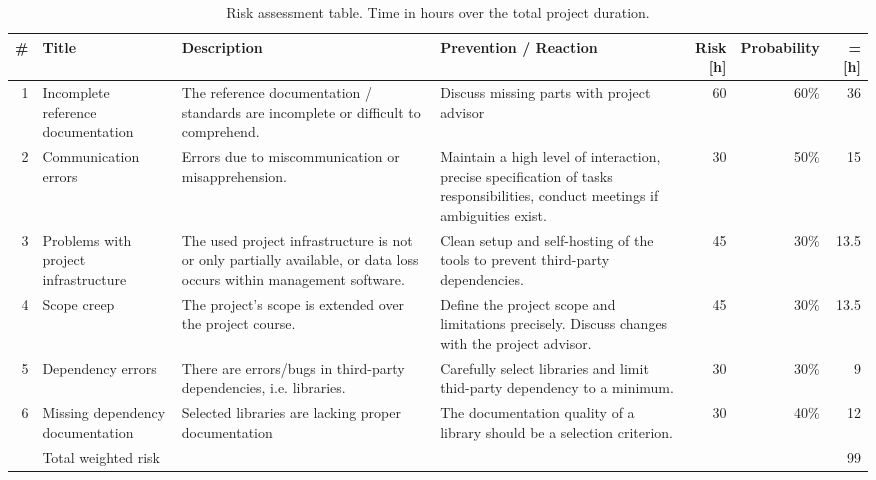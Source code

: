 \begin{table}
    \centering
    \caption[Risk assessment]{Risk assessment table. Time in hours over the total project duration.}
    \label{tbl:project-risks}
    \begin{tabu}{r l X X r r r}
        \hline
        \# & Title & Description & Prevention / Reaction & Risk [h] & Probability & = [h] \\ \hline

        1 & Incomplete reference documentation
          & The reference documentation / standards are incomplete or difficult to comprehend.
          & Discuss missing parts with project advisor
          & 60 & 60\% & 36\\

        2 & Communication errors
          & Errors due to miscommunication or misapprehension.
          & Maintain a high level of interaction, precise specification of tasks responsibilities, conduct meetings if ambiguities exist.
          & 30 & 50\% & 15\\

        3 & Problems with project infrastructure
          & The used project infrastructure is not or only partially available, or data loss occurs within management software.
          & Clean setup and self-hosting of the tools to prevent third-party dependencies.
          & 45 & 30\% & 13.5 \\

        4 & Scope creep
          & The project's scope is extended over the project course.
          & Define the project scope and limitations precisely. Discuss changes with the project advisor.
          & 45 & 30\% & 13.5\\

        5 & Dependency errors
          & There are errors/bugs in third-party dependencies, i.e. libraries.
          & Carefully select libraries and limit thid-party dependency to a minimum.
          & 30 & 30\% & 9\\

        6 & Missing dependency documentation
          & Selected libraries are lacking proper documentation
          & The documentation quality of a library should be a selection criterion.
          & 30 & 40\% & 12\\

         \hline
        & Total weighted risk & & & & & 99\\
        \hline
    \end{tabu}
\end{table}


